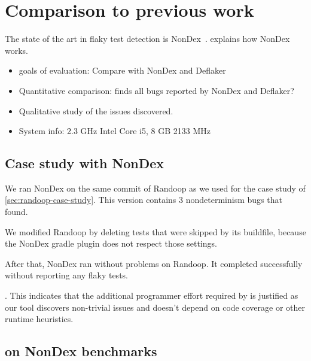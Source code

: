 \section{Comparison to previous work}

The state of the art in flaky test detection is NonDex~\cite{nondex}.
 explains how NonDex works.



\begin{itemize}
    \item goals of evaluation: Compare with NonDex and Deflaker
    \item Quantitative comparison: \TheDeterminismChecker finds all bugs reported by NonDex and Deflaker?
    \item Qualitative study of the issues discovered.
    \item System info: 2.3 GHz Intel Core i5, 8 GB 2133 MHz
\end{itemize}


\subsection{Case study with NonDex}\label{sec:nondex-randoop}

We ran NonDex on the same commit of Randoop as we used for the case study
of \cref{sec:randoop-case-study}.  This version contains 3 nondeterminism bugs that
\theDeterminismChecker found.

We modified Randoop by deleting tests that were skipped by its buildfile,
because the NonDex gradle plugin does not respect those settings.

After that, NonDex ran without problems on Randoop.
It completed successfully without reporting any flaky tests.


.
This indicates that the additional programmer effort required by \TheDeterminismChecker is justified
as our tool discovers non-trivial issues and doesn't depend on code coverage or other runtime heuristics.

\subsection{\TheDeterminismChecker on NonDex benchmarks}\label{sec:nondex-benchmarks}

